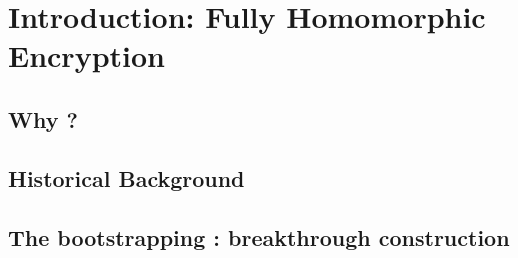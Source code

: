 \chapter{Introduction: Fully Homomorphic Encryption}



\section{Why ?}





\section{Historical Background}






\section{The bootstrapping : breakthrough construction}


